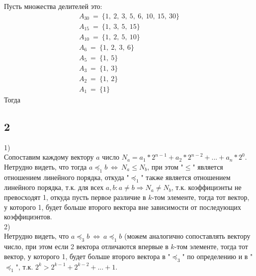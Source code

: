 		Пусть множества делителей это:\\
		\begin{gather*}
		A_{30} \: = \: \{ 1,\: 2,\: 3,\: 5,\: 6,\: 10,\: 15,\: 30 \}\\
		A_{15} \: = \: \{ 1,\: 3,\: 5,\: 15 \}\\
		A_{10} \: = \: \{ 1,\: 2,\: 5,\: 10\}\\
		A_{6} \: = \: \{ 1,\: 2,\: 3,\: 6\}\\
		A_{5} \: = \: \{ 1,\: 5 \}\\
		A_{3} \: = \: \{ 1,\: 3 \}\\
		A_{2} \: = \: \{ 1,\: 2 \}\\
		A_{1} \: = \: \{ 1 \}
		\end{gather*}
		Тогда
		\begin{center}
		\end{center}
		
		\subsection{2}
		1)\\
		Сопоставим каждому вектору $a$ число $N_a = a_1*2^{n-1} + a_2*2^{n-2} + ... + a_n*2^0$. Нетрудно видеть, что тогда $a \preceq_1 b \: \Leftrightarrow \: N_a \leq N_b$, при этом "$\leq$" является отношением линейного порядка, откуда  "$\preceq_1$" также является отношением линейного порядка, т.к. для всех $a,b : a \ne b \Rightarrow N_a \ne N_b$, т.к. коэффициэнты не превосходят 1, откуда пусть первое различие в $k$-том элементе, тогда тот вектор, у которого 1, будет больше второго вектора вне зависимости от последующих коэффициэнтов.\\
		2)\\
		Нетрудно видеть, что $a \preceq_3 b \: \Leftrightarrow \: a \preceq_1 b$ (можем аналогично сопоставлять вектору число, при этом если 2 вектора отличаются впервые в $k$-том элементе, тогда тот вектор, у которого 1, будет больше второго вектора в "$\preceq_3$" по определению и в "$\preceq_1$", т.к. $2^k > 2^{k-1} + 2^{k-2} + ... + 1$.
		
